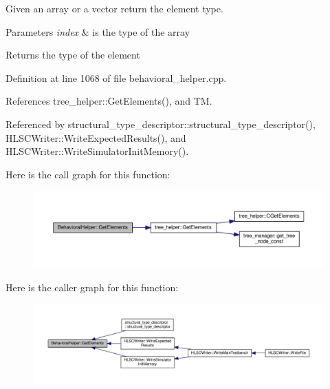 Given an array or a vector return the element type. 


\begin{DoxyParams}{Parameters}
{\em index} & is the type of the array \\
\hline
\end{DoxyParams}
\begin{DoxyReturn}{Returns}
the type of the element 
\end{DoxyReturn}


Definition at line 1068 of file behavioral\+\_\+helper.\+cpp.



References tree\+\_\+helper\+::\+Get\+Elements(), and TM.



Referenced by structural\+\_\+type\+\_\+descriptor\+::structural\+\_\+type\+\_\+descriptor(), H\+L\+S\+C\+Writer\+::\+Write\+Expected\+Results(), and H\+L\+S\+C\+Writer\+::\+Write\+Simulator\+Init\+Memory().

Here is the call graph for this function\+:
\nopagebreak
\begin{figure}[H]
\begin{center}
\leavevmode
\includegraphics[width=350pt]{dd/db2/classBehavioralHelper_a2966a26651cad6597705927691d8af6e_cgraph}
\end{center}
\end{figure}
Here is the caller graph for this function\+:
\nopagebreak
\begin{figure}[H]
\begin{center}
\leavevmode
\includegraphics[width=350pt]{dd/db2/classBehavioralHelper_a2966a26651cad6597705927691d8af6e_icgraph}
\end{center}
\end{figure}
\mbox{\label{classBehavioralHelper_aef8f504d20cd83dd699378e233b86ae6}} 

